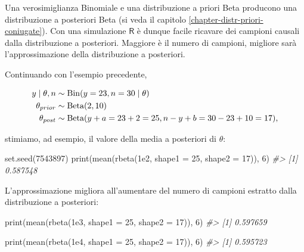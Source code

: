 \documentclass[
]{memoir}
\newenvironment{Shaded}{\begin{snugshade}}{\end{snugshade}}
\newcommand{\AttributeTok}[1]{\textcolor[rgb]{0.77,0.63,0.00}{#1}}
\newcommand{\CommentTok}[1]{\textcolor[rgb]{0.56,0.35,0.01}{\textit{#1}}}
\newcommand{\DecValTok}[1]{\textcolor[rgb]{0.00,0.00,0.81}{#1}}
\newcommand{\FloatTok}[1]{\textcolor[rgb]{0.00,0.00,0.81}{#1}}
\newcommand{\FunctionTok}[1]{\textcolor[rgb]{0.00,0.00,0.00}{#1}}
\newcommand{\NormalTok}[1]{#1}
\DeclareMathOperator{\Bin}{Bin} %
\newcommand{\R}{\textsf{R}} %
\begin{document}
Una verosimiglianza Binomiale e una distribuzione a priori Beta producono una distribuzione a posteriori Beta (si veda il capitolo \ref{chapter-distr-priori-coniugate}). Con una simulazione \(\R\) è dunque facile ricavare dei campioni causali dalla distribuzione a posteriori. Maggiore è il numero di campioni, migliore sarà l'approssimazione della distribuzione a posteriori.

Continuando con l'esempio precedente,

\begin{align}
y \mid \theta, n &\sim \Bin(y = 23, n = 30 \mid \theta) \notag\\
\theta_{prior} &\sim \mbox{Beta}(2, 10) \notag\\
\theta_{post}  &\sim \mbox{Beta}(y + a = 23 + 2 = 25, n - y + b = 30 - 23 + 10 = 17), \notag
\end{align}

\noindent
stimiamo, ad esempio, il valore della media a posteriori di \(\theta\):

\begin{Shaded}
\begin{Highlighting}[]
\FunctionTok{set.seed}\NormalTok{(}\DecValTok{7543897}\NormalTok{)}
\FunctionTok{print}\NormalTok{(}\FunctionTok{mean}\NormalTok{(}\FunctionTok{rbeta}\NormalTok{(}\FloatTok{1e2}\NormalTok{, }\AttributeTok{shape1 =} \DecValTok{25}\NormalTok{, }\AttributeTok{shape2 =} \DecValTok{17}\NormalTok{)), }\DecValTok{6}\NormalTok{)}
\CommentTok{\#\textgreater{} [1] 0.587548}
\end{Highlighting}
\end{Shaded}

\noindent
L'approssimazione migliora all'aumentare del numero di campioni estratto dalla distribuzione a posteriori:

\begin{Shaded}
\begin{Highlighting}[]
\FunctionTok{print}\NormalTok{(}\FunctionTok{mean}\NormalTok{(}\FunctionTok{rbeta}\NormalTok{(}\FloatTok{1e3}\NormalTok{, }\AttributeTok{shape1 =} \DecValTok{25}\NormalTok{, }\AttributeTok{shape2 =} \DecValTok{17}\NormalTok{)), }\DecValTok{6}\NormalTok{)}
\CommentTok{\#\textgreater{} [1] 0.597659}
\end{Highlighting}
\end{Shaded}

\begin{Shaded}
\begin{Highlighting}[]
\FunctionTok{print}\NormalTok{(}\FunctionTok{mean}\NormalTok{(}\FunctionTok{rbeta}\NormalTok{(}\FloatTok{1e4}\NormalTok{, }\AttributeTok{shape1 =} \DecValTok{25}\NormalTok{, }\AttributeTok{shape2 =} \DecValTok{17}\NormalTok{)), }\DecValTok{6}\NormalTok{)}
\CommentTok{\#\textgreater{} [1] 0.595723}
\end{Highlighting}
\end{Shaded}
\end{document}
